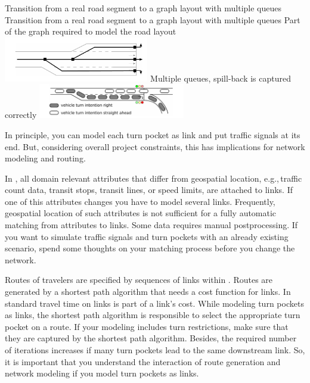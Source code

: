 \createfigure%
{Transition from a real road segment to a graph layout with multiple queues}%
{Transition from a real road segment to a graph layout with multiple queues}
{\label{fig:lanes_representation}}%
{%
  \createsubfigure%
	{Part of the graph required to model the road layout}
	{\includegraphics[width=0.475\textwidth]{extending/figures/signalslanes/link_lanes_layout}}
	{\label{fig:model_link_layout}}
  \createsubfigure%
	{Multiple queues, spill-back is captured correctly}%
	{\includegraphics[width=0.48\textwidth]{extending/figures/signalslanes/multiple_queue_model_inkscape.pdf}}%
	{\label{fig:lanes_representation_multiple_queue}}%
}%
{\citet{Grether2014PhD}}

In principle, you can model each turn pocket as link and put traffic signals at its end. 
But, considering overall project constraints, this has implications for network modeling and routing. 

In , all domain relevant attributes that differ from geospatial location, e.g.,\,traffic count data, transit stops, transit lines, or speed limits, are attached to links. 
If one of this attributes changes you have to model several links. 
Frequently, geospatial location of such attributes is not sufficient for a fully automatic matching from attributes to links. 
Some data requires manual postprocessing. 
If you want to simulate traffic signals and turn pockets with an already existing scenario, spend some thoughts on your matching process before you change the network.  

Routes of travelers are specified by sequences of links within . 
Routes are generated by a shortest path algorithm that needs a cost function for links. 
In standard  travel time on links is part of a link's cost.
While modeling turn pockets as links, the shortest path algorithm is responsible to select the appropriate turn pocket on a route.
If your modeling includes turn restrictions, make sure that they are captured by the shortest path algorithm. 
Besides, the required number of iterations increases if many turn pockets lead to the same downstream link. 
So, it is important that you understand the interaction of route generation and network modeling if you model turn pockets as links. 

